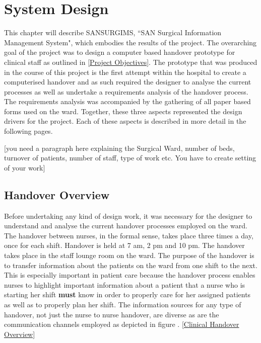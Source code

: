\section{System Design}
This chapter will describe SANSURGIMS, ``SAN Surgical Information Management System", which embodies the results of the project. The overarching goal of the project was to design a computer based handover prototype for clinical staff as outlined in \ref{Project Objectives}. The prototype that was produced in the course of this project is the first attempt within the hospital to create a computerised handover and as such required the designer to analyse the current processes as well as undertake a requirements analysis of the handover process. The requirements analysis was accompanied by the gathering of all paper based forms used on the ward. Together, these three aspects represented the design drivers for the project. Each of these aspects is described in more detail in the following pages.   

[you need a paragraph here explaining the Surgical Ward, number of beds, turnover of patients, number of staff, type of work etc. You have to create setting of your work]

\subsection{Handover Overview}
Before undertaking any kind of design work, it was necessary for the designer to understand and analyse the current handover processes employed on the ward.   The handover between nurses, in the formal sense, takes place three times a day, once for each shift. Handover is held at 7 am, 2 pm and 10 pm. The handover takes place in the staff lounge room on the ward. The purpose of the handover is to transfer information about the patients on the ward from one shift to the next. This is especially important in patient care because the handover process enables nurses to highlight important information about a patient that a nurse who is starting her shift \textbf{must} know in order to properly care for her assigned patients as well as to properly plan her shift. The information sources for any type of handover, not just the nurse to nurse handover, are diverse as are the communication channels employed as depicted in figure .
\ref{Clinical Handover Overview}

